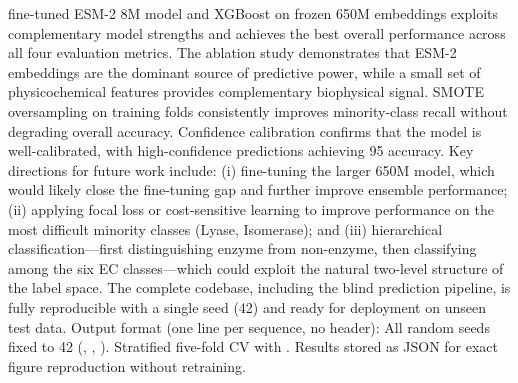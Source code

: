 {}fine-tuned ESM-2 8M model and XGBoost on frozen 650M embeddings exploits complementary model\markdownRendererSoftLineBreak
{}strengths and achieves the best overall performance across all four evaluation metrics.\markdownRendererParagraphSeparator
{}The ablation study demonstrates that ESM-2 embeddings are the dominant source of predictive\markdownRendererSoftLineBreak
{}power, while a small set of physicochemical features provides complementary biophysical\markdownRendererSoftLineBreak
{}signal. SMOTE oversampling on training folds consistently improves minority-class recall\markdownRendererSoftLineBreak
{}without degrading overall accuracy. Confidence calibration confirms that the model is\markdownRendererSoftLineBreak
{}well-calibrated, with high-confidence predictions achieving 95 \markdownRendererPercentSign{} accuracy.\markdownRendererParagraphSeparator
{}Key directions for future work include: (i) fine-tuning the larger 650M model, which would\markdownRendererSoftLineBreak
{}likely close the fine-tuning gap and further improve ensemble performance; (ii) applying focal\markdownRendererSoftLineBreak
{}loss or cost-sensitive learning to improve performance on the most difficult minority classes\markdownRendererSoftLineBreak
{}(Lyase, Isomerase); and (iii) hierarchical classification—first distinguishing enzyme from\markdownRendererSoftLineBreak
{}non-enzyme, then classifying among the six EC classes—which could exploit the natural two-level\markdownRendererSoftLineBreak
{}structure of the label space.\markdownRendererParagraphSeparator
{}The complete codebase, including the blind prediction pipeline, is fully reproducible with a\markdownRendererSoftLineBreak
{}single seed (42) and ready for deployment on unseen test data.\markdownRendererInterblockSeparator
{}
\markdownRendererSectionEnd \markdownRendererSectionBegin
{}\markdownRendererInterblockSeparator
{}\markdownRendererSectionBegin
{}\markdownRendererInterblockSeparator
{}\markdownRendererInterblockSeparator
{}Output format (one line per sequence, no header):\markdownRendererInterblockSeparator
{}\markdownRendererInterblockSeparator
{}
\markdownRendererSectionEnd \markdownRendererSectionBegin
{}\markdownRendererInterblockSeparator
{}\markdownRendererInterblockSeparator
{}
\markdownRendererSectionEnd \markdownRendererSectionBegin
{}\markdownRendererInterblockSeparator
{}All random seeds fixed to 42 (, , ). Stratified five-fold CV with\markdownRendererSoftLineBreak
{}. Results stored as JSON for exact figure reproduction without\markdownRendererSoftLineBreak
{}retraining.
\markdownRendererSectionEnd 
\markdownRendererSectionEnd 
\markdownRendererSectionEnd \markdownRendererDocumentEnd